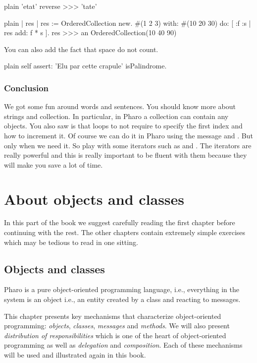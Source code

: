 \documentclass[10pt,twoside,english]{_support/latex/sbabook/sbabook}
\begin{document}
\begin{displaycode}{plain}
'etat' reverse 
>>> 'tate'
\end{displaycode}

\begin{displaycode}{plain}
| res |
res := OrderedCollection new. 
#(1 2 3) with: #(10 20 30) do: [ :f :s | res add: f * s ].
res
>>> an OrderedCollection(10 40 90)
\end{displaycode}

You can also add the fact that space do not count. 

\begin{displaycode}{plain}
	self assert: 'Elu par cette crapule' isPalindrome.
\end{displaycode}
\section{Conclusion}
We got some fun around words and sentences. You should know more about strings and collection. In particular, in Pharo a collection can contain any objects. You also saw is that loops to not require to specify the first index and how to increment it. Of course we can do it in Pharo using the message  and . But only when we need it. So play with some iterators such as  and . The iterators are really powerful and this is really important to be fluent with them because they will make you save a lot of time. 

 
\part{About objects and classes}
In this part of the book we suggest carefully reading the first chapter before continuing with the rest.
The other chapters contain extremely simple exercises which may be tedious to read in one sitting.
\chapter{Objects and classes}\label{cha:objectclass}
Pharo is a pure object-oriented programming language, i.e., everything in the system is an object i.e., an entity created by a class and reacting to messages.

This chapter presents key mechanisms that characterize object-oriented programming: \textit{objects}, \textit{classes},  \textit{messages} and \textit{methods}. We will also present \textit{distribution of responsibilities} which is one of the heart of object-oriented programming as well as \textit{delegation} and \textit{composition}. Each of these mechanisms will be used and illustrated again in this book.
\end{document}
